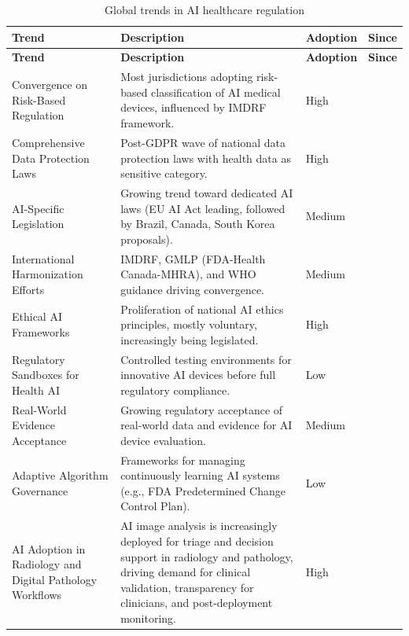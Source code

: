 \begin{tcolorbox}[
  colback=white,
  colframe=aivanavy,
  boxrule=0.9pt,
  arc=1.5pt,
  left=2pt,
  right=2pt,
  top=3pt,
  bottom=3pt,
  breakable,
]
\footnotesize
\setlength{\tabcolsep}{5pt}
\renewcommand{\arraystretch}{1.3}
\begin{longtable}{|>{\raggedright\arraybackslash}p{}|>{\raggedright\arraybackslash}p{}|>{\centering\arraybackslash}p{}|>{\centering\arraybackslash}p{}|}
\caption[Global trends in AI healthcare regulation]{Global trends in AI healthcare regulation} \label{tab:global-trends} \\
\hline
\rowcolor{aivagray}
\textbf{Trend} & \textbf{Description} & \textbf{Adoption} & \textbf{Since} \\
\hline
\endfirsthead
\hline
\rowcolor{aivagray}
\textbf{Trend} & \textbf{Description} & \textbf{Adoption} & \textbf{Since} \\
\hline
\endhead
\hline
\endfoot
Convergence on Risk-Based Regulation & Most jurisdictions adopting risk-based classification of AI medical devices, influenced by IMDRF framework. & High & 2017 \\ \hline
Comprehensive Data Protection Laws & Post-GDPR wave of national data protection laws with health data as sensitive category. & High & 2018 \\ \hline
AI-Specific Legislation & Growing trend toward dedicated AI laws (EU AI Act leading, followed by Brazil, Canada, South Korea proposals). & Medium & 2021 \\ \hline
International Harmonization Efforts & IMDRF, GMLP (FDA-Health Canada-MHRA), and WHO guidance driving convergence. & Medium & 2019 \\ \hline
Ethical AI Frameworks & Proliferation of national AI ethics principles, mostly voluntary, increasingly being legislated. & High & 2018 \\ \hline
Regulatory Sandboxes for Health AI & Controlled testing environments for innovative AI devices before full regulatory compliance. & Low & 2020 \\ \hline
Real-World Evidence Acceptance & Growing regulatory acceptance of real-world data and evidence for AI device evaluation. & Medium & 2019 \\ \hline
Adaptive Algorithm Governance & Frameworks for managing continuously learning AI systems (e.g., FDA Predetermined Change Control Plan). & Low & 2021 \\ \hline
AI Adoption in Radiology and Digital Pathology Workflows & AI image analysis is increasingly deployed for triage and decision support in radiology and pathology, driving demand for clinical validation, transparency for clinicians, and post-deployment monitoring. & High & 2021 \\ \hline

\end{longtable}
\end{tcolorbox}
